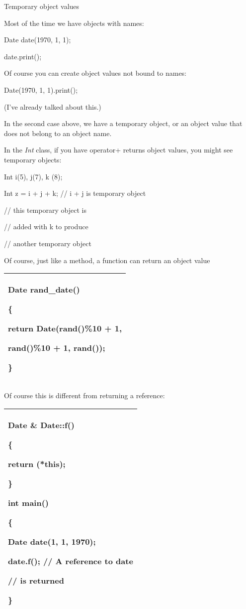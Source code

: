 \documentclass[
]{article}
\begin{document}
Temporary object values

Most of the time we have objects with names:

Date date(1970, 1, 1);

date.print();

Of course you can create object values not bound to names:

Date(1970, 1, 1).print();

(I've already talked about this.)

In the second case above, we have a temporary object, or an object value
that does not belong to an object name.

In the \emph{Int} class, if you have operator+ returns object values,
you might see temporary objects:

Int i(5), j(7), k (8);

Int z = i + j + k; // i + j is temporary object

// this temporary object is

// added with k to produce

// another temporary object

Of course, just like a method, a function can return an object value

\begin{longtable}[]{@{}l@{}}
\toprule
\endhead
\begin{minipage}[t]{0.97\columnwidth}\raggedright
Date rand\_date()

\{

return Date(rand()\%10 + 1,

rand()\%10 + 1, rand());

\}\strut
\end{minipage}\tabularnewline
\bottomrule
\end{longtable}

Of course this is different from returning a reference:

\begin{longtable}[]{@{}l@{}}
\toprule
\endhead
\begin{minipage}[t]{0.97\columnwidth}\raggedright
Date \& Date::f()

\{

return (*this);

\}

int main()

\{

Date date(1, 1, 1970);

date.f(); // A reference to date

// is returned

\}\strut
\end{minipage}\tabularnewline
\bottomrule
\end{longtable}
\end{document}
